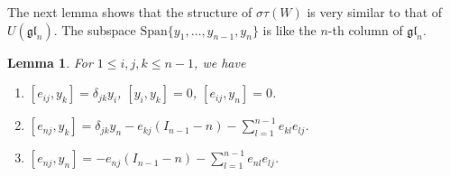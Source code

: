 \documentclass[12pt,a4paper]{amsart}
\newtheorem{lemma}[theorem]{Lemma}%
\numberwithin{equation}{section}
\def\gl{\mathfrak{gl}}
\begin{document}
%
%
%
%

The next lemma shows that
the structure of  $\sigma\tau(W)$ is very similar to that of $U(\gl_n)$.
The  subspace $\mathrm{Span}\{y_1,\dots,y_{n-1},y_n\}$
is like the $n$-th column of $\gl_n$.

\begin{lemma}\label{lemma-3.3} For $1\leq i,j, k\leq n-1$, we have
\begin{enumerate}
\item  $[e_{ij},y_k]=\delta_{jk}y_i$, $[y_i,y_k]=0$, $[e_{ij},y_n]=0$.
\item $[e_{nj},y_k]=\delta_{jk}y_n-e_{kj}(I_{n-1}-n)
-\sum_{l=1}^{n-1} e_{kl}e_{lj}$.
\item  $[e_{nj},y_n]
=-e_{nj}(I_{n-1}-n)-\sum_{l=1}^{n-1} e_{nl}e_{lj}$.
\end{enumerate}
\end{lemma}
\end{document}
